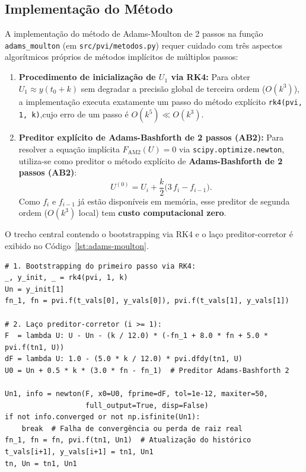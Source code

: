 \documentclass[12pt, a4paper]{article}
\begin{document}
\subsection{Implementação do Método}
\label{sec:c-implementacao}

A implementação do método de Adams-Moulton de 2 passos na função \texttt{adams\_moulton} (em
\texttt{src/pvi/metodos.py}) requer cuidado com três aspectos algorítmicos próprios de métodos implícitos de múltiplos
passos:
\begin{enumerate}
  \item \textbf{Procedimento de inicialização de $U_1$ via RK4:}  Para obter $U_1 \approx y(t_0 + k)$ sem degradar a precisão global de terceira ordem ($O(k^3)$), a implementação executa
    exatamente um passo do método explícito \texttt{rk4(pvi, 1, k)},cujo erro de um passo é
    $O(k^5) \ll O(k^3)$.
  \item \textbf{Preditor explícito de Adams-Bashforth de 2 passos (AB2):} Para resolver a equação
    implícita $F_{\text{AM2}}(U) = 0$ via \texttt{scipy.optimize.newton}, utiliza-se como preditor o método explícito de \textbf{Adams-Bashforth de 2 passos (AB2)}:
    \begin{equation}\label{eq:preditor-ab2}
      U^{(0)} = U_i + \frac{k}{2}\bigl(3\,f_i - f_{i-1}\bigr).
    \end{equation}
    Como $f_i$ e $f_{i-1}$ já estão disponíveis em memória, esse preditor de segunda ordem ($O(k^3)$ local) tem
    \textbf{custo computacional zero}.
\end{enumerate}
O trecho central contendo o bootstrapping via RK4 e o laço preditor-corretor é exibido no Código~\ref{lst:adams-moulton}.

\begin{listing}[H]
\caption{Inicialização via RK4 e laço preditor-corretor do Adams-Moulton de 2 passos.}\label{lst:adams-moulton}
\begin{verbatim}
# 1. Bootstrapping do primeiro passo via RK4:
_, y_init, _ = rk4(pvi, 1, k)
Un = y_init[1]
fn_1, fn = pvi.f(t_vals[0], y_vals[0]), pvi.f(t_vals[1], y_vals[1])

# 2. Laço preditor-corretor (i >= 1):
F  = lambda U: U - Un - (k / 12.0) * (-fn_1 + 8.0 * fn + 5.0 * pvi.f(tn1, U))
dF = lambda U: 1.0 - (5.0 * k / 12.0) * pvi.dfdy(tn1, U)
U0 = Un + 0.5 * k * (3.0 * fn - fn_1)  # Preditor Adams-Bashforth 2

Un1, info = newton(F, x0=U0, fprime=dF, tol=1e-12, maxiter=50,
                   full_output=True, disp=False)
if not info.converged or not np.isfinite(Un1):
    break  # Falha de convergência ou perda de raiz real
fn_1, fn = fn, pvi.f(tn1, Un1)  # Atualização do histórico
t_vals[i+1], y_vals[i+1] = tn1, Un1
tn, Un = tn1, Un1
\end{verbatim}
\end{listing}
\end{document}
